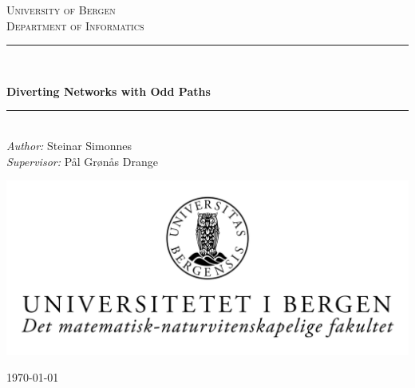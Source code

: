 \begin{titlepage}

\newcommand{\HRule}{\rule{\linewidth}{0.5mm}}

\center

\textsc{\LARGE University of Bergen \\ Department of Informatics}\\[1.5cm]

\HRule \\[0.5cm]
\begin{Huge}
	\bfseries{Diverting Networks with Odd Paths}\\[0.7cm]
\end{Huge}
\HRule \\[0.5cm]

\large \emph{Author:} Steinar Simonnes\\
\large \emph{Supervisor:} Pål Grønås Drange\\[2cm]

\centerline{\includegraphics[scale=1.9]{figures/canvasWithFaculty}}

{\large \monthyeardate\today}\\[3cm]

\vfill

\end{titlepage}

